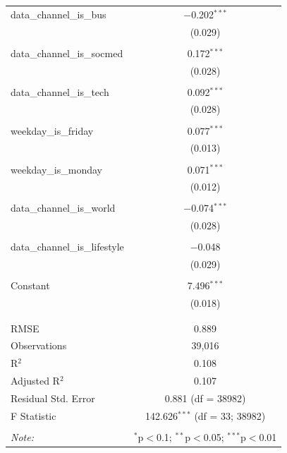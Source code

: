 \begin{table}[h]
\begin{tabular}{@{\extracolsep{5pt}}lc}
 data\_channel\_is\_bus & $-$0.202$^{***}$ \\ 
  & (0.029) \\ 
  & \\ 
 data\_channel\_is\_socmed & 0.172$^{***}$ \\ 
  & (0.028) \\ 
  & \\ 
 data\_channel\_is\_tech & 0.092$^{***}$ \\ 
  & (0.028) \\ 
  & \\ 
 weekday\_is\_friday & 0.077$^{***}$ \\ 
  & (0.013) \\ 
  & \\ 
 weekday\_is\_monday & 0.071$^{***}$ \\ 
  & (0.012) \\ 
  & \\ 
 data\_channel\_is\_world & $-$0.074$^{***}$ \\ 
  & (0.028) \\ 
  & \\ 
 data\_channel\_is\_lifestyle & $-$0.048 \\ 
  & (0.029) \\ 
  & \\ 
 Constant & 7.496$^{***}$ \\ 
  & (0.018) \\ 
  & \\ 
\hline \\[-1.8ex] 
RMSE & 0.889 \\ 
Observations & 39,016 \\ 
R$^{2}$ & 0.108 \\ 
Adjusted R$^{2}$ & 0.107 \\ 
Residual Std. Error & 0.881 (df = 38982) \\ 
F Statistic & 142.626$^{***}$ (df = 33; 38982) \\ 
\hline 
\hline \\[-1.8ex] 
\textit{Note:}  & \multicolumn{1}{r}{$^{*}$p$<$0.1; $^{**}$p$<$0.05; $^{***}$p$<$0.01} \\ 
\end{tabular} 
\end{table} 
